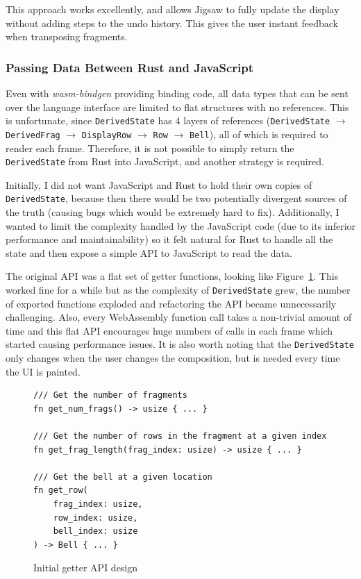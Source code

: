 \documentclass[12pt]{article}
\begin{document}
This approach works excellently, and allows Jigsaw to fully update the display without adding steps
to the undo history.  This gives the user instant feedback when transposing fragments.

\subsubsection{Passing Data Between Rust and JavaScript}

Even with \emph{wasm-bindgen} providing binding code, all data types that can be sent over the
language interface are limited to flat structures with no references.  This is unfortunate, since
\verb|DerivedState| has 4 layers of references (\verb|DerivedState| $\to$ \verb|DerivedFrag| $\to$
\verb|DisplayRow| $\to$ \verb|Row| $\to$ \verb|Bell|), all of which is required to render each
frame.  Therefore, it is not possible to simply return the \verb|DerivedState| from Rust into
JavaScript, and another strategy is required.

Initially, I did not want JavaScript and Rust to hold their own copies of \verb|DerivedState|,
because then there would be two potentially divergent sources of the truth (causing bugs which would
be extremely hard to fix).  Additionally, I wanted to limit the complexity handled by the JavaScript
code (due to its inferior performance and maintainability) so it felt natural for Rust to handle all
the state and then expose a simple API to JavaScript to read the data.

The original API was a flat set of getter functions, looking like Figure~\ref{fig:initial-api}.
This worked fine for a while but as the complexity of \verb|DerivedState| grew, the number of
exported functions exploded and refactoring the API became unnecessarily challenging.  Also, every
WebAssembly function call takes a non-trivial amount of time and this flat API encourages huge
numbers of calls in each frame which started causing performance issues.  It is also worth noting
that the \verb|DerivedState| only changes when the user changes the composition, but is needed every
time the UI is painted.

\begin{figure}
    \begin{verbatim}
/// Get the number of fragments
fn get_num_frags() -> usize { ... }

/// Get the number of rows in the fragment at a given index
fn get_frag_length(frag_index: usize) -> usize { ... }

/// Get the bell at a given location
fn get_row(
    frag_index: usize,
    row_index: usize,
    bell_index: usize
) -> Bell { ... }
    \end{verbatim}
    \caption{Initial getter API design}\label{fig:initial-api}
\end{figure}
\end{document}
